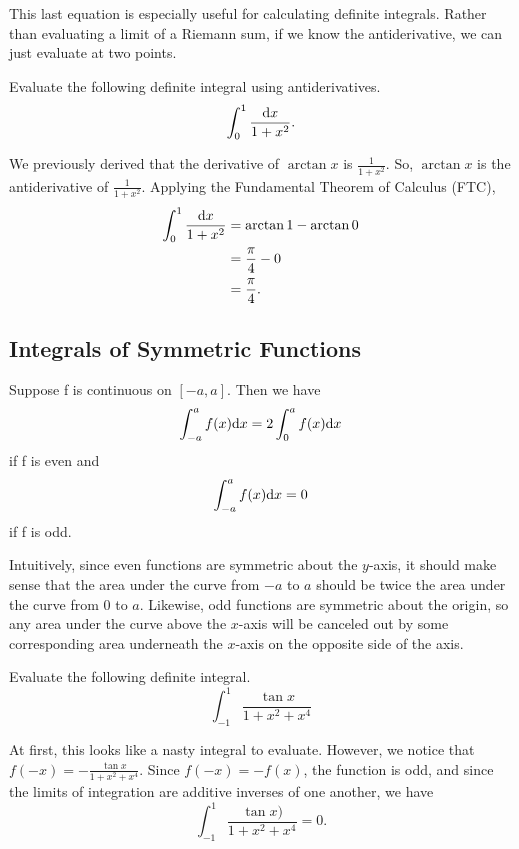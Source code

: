 This last equation is especially useful for calculating definite integrals.
Rather than evaluating a limit of a Riemann sum, if we know the antiderivative, we can just evaluate at two points.

\begin{example}
	Evaluate the following definite integral using antiderivatives.
	\begin{equation*}
		\int_{0}^{1}{\frac{\mathrm{d} x}{1+x^2}}.
	\end{equation*}
\end{example}
\begin{answer}
	We previously derived that the derivative of $\arctan{x}$ is $\frac{1}{1+x^2}$.
	So, $\arctan{x}$ is the antiderivative of $\frac{1}{1+x^2}$.
	Applying the Fundamental Theorem of Calculus (FTC),
	\begin{align*}
		\int_{0}^{1}{\frac{\mathrm{d} x}{1+x^2}} &= \arctan{1} - \arctan{0} \\
		&= \frac{\pi}{4} - 0 \\
		&= \frac{\pi}{4}.
	\end{align*} 
\end{answer}

\subsection{Integrals of Symmetric Functions}
Suppose f is continuous on $[-a, a]$. Then we have
\begin{equation*}
	\int_{-a}^{a}{f(x)\mathrm{d} x} = 2 \int_{0}^{a}{f(x)\mathrm{d} x}
\end{equation*}
if f is even and
\begin{equation*}
	\int_{-a}^{a}{f(x)\mathrm{d} x} = 0
\end{equation*}
if f is odd.\bigskip

\noindent
Intuitively, since even functions are symmetric about the $y$-axis, it should make sense that the area under the curve from $-a$ to $a$ should be twice the area under the curve from 0 to $a$. 
Likewise, odd functions are symmetric about the origin, so any area under the curve above the $x$-axis will be canceled out by some corresponding area underneath the $x$-axis on the opposite side of the axis.

\begin{example}
	Evaluate the following definite integral.
	\begin{equation*}
		\int_{-1}^{1}{\frac{\tan{x}}{1 + x^2 + x^4}}
	\end{equation*}
\end{example}
\begin{answer}
	At first, this looks like a nasty integral to evaluate. 
	However, we notice that $f(-x) = -\frac{\tan{x}}{1 + x^2 + x^4}$.
	Since $f(-x) = -f(x)$, the function is odd, and since the limits of integration are additive inverses of one another, we have
	\begin{equation*}
		\int_{-1}^{1}{\frac{\tan{x})}{1 + x^2 + x^4}} = 0.
	\end{equation*}
\end{answer}